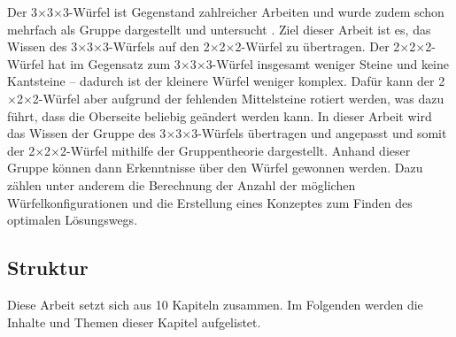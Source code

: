 \documentclass[12pt,a4paper, usenames, dvipsnames]{article}
\theoremstyle{mystyle}
\theoremstyle{definition}
\newcommand{\Ttwo}{2$\times$2$\times$2-}
\newcommand{\Tthree}{3$\times$3$\times$3-}
\begin{document}
Der \Tthree Würfel ist Gegenstand zahlreicher Arbeiten und
wurde zudem schon mehrfach als Gruppe dargestellt und untersucht  \cite{JC,TD,DDJT,DJ,RMG,TR}. Ziel dieser Arbeit ist es, das Wissen des \Tthree Würfels auf den \Ttwo Würfel zu übertragen. Der \Ttwo Würfel hat im Gegensatz zum \Tthree Würfel insgesamt weniger Steine und keine Kantsteine -- dadurch ist der kleinere Würfel weniger komplex. Dafür kann der \Ttwo Würfel aber aufgrund der fehlenden Mittelsteine rotiert werden, was dazu führt, dass die Oberseite beliebig geändert werden kann. In dieser Arbeit wird das Wissen der Gruppe des \Tthree Würfels übertragen und angepasst und somit der \Ttwo Würfel mithilfe der Gruppentheorie dargestellt. Anhand dieser Gruppe können dann Erkenntnisse über den Würfel gewonnen werden. Dazu zählen unter anderem die Berechnung der Anzahl der möglichen Würfelkonfigurationen und die Erstellung eines Konzeptes zum Finden des optimalen Lösungswegs.


%
%
%
%
%
%
%
%
\subsection{Struktur} 

Diese Arbeit setzt sich aus 10 Kapiteln zusammen. Im Folgenden werden die Inhalte und Themen dieser Kapitel aufgelistet.
\end{document}
